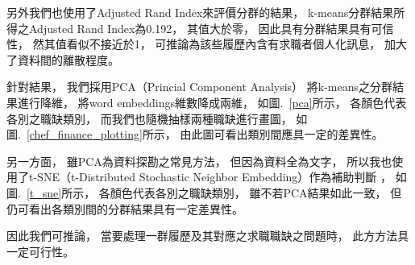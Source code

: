 \documentclass[acmsmall]{acmart}
\begin{document}
另外我們也使用了Adjusted Rand Index來評價分群的結果\cite{hubert1985comparing}，
k-means分群結果所得之Adjusted Rand Index為0.192，
其值大於零，
因此具有分群結果具有可信性，
然其值看似不接近於1，
可推論為該些履歷內含有求職者個人化訊息，
加大了資料間的離散程度。

針對結果，
我們採用PCA（Princial Component Analysis）\cite{pearson1901liii} \cite{han2011data}將k-means之分群結果進行降維，
將word embeddings維數降成兩維，
如圖.~\ref{pca}所示，
各顏色代表各別之職缺類別，
而我們也隨機抽樣兩種職缺進行畫圖，
如圖.~\ref{chef_finance_plotting}所示，
由此圖可看出類別間應具一定的差異性。


另一方面，
雖PCA為資料探勘之常見方法，
但因為資料全為文字，
所以我也使用了t-SNE（t-Distributed Stochastic Neighbor Embedding）\cite{van2008visualizing}作為補助判斷 ，
如圖.~\ref{t_sne}所示，
各顏色代表各別之職缺類別，
雖不若PCA結果如此一致，
但仍可看出各類別間的分群結果具有一定差異性。

因此我們可推論，
當要處理一群履歷及其對應之求職職缺之問題時，
此方方法具一定可行性。
\end{document}
